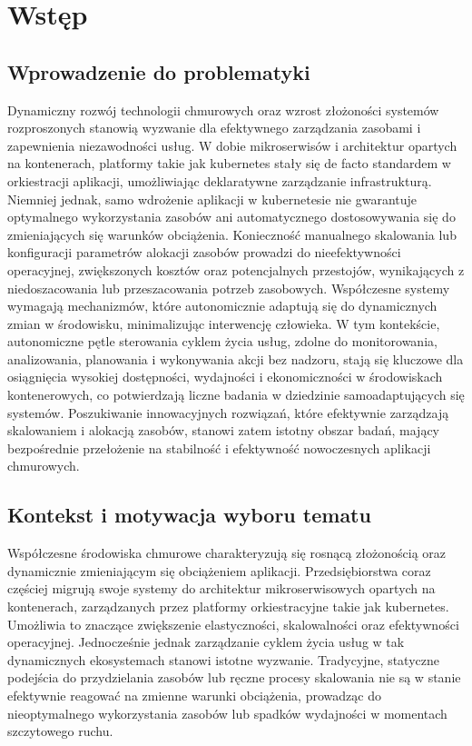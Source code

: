 \newpage

\section{Wstęp}

\subsection{Wprowadzenie do problematyki}

Dynamiczny rozwój technologii chmurowych oraz wzrost złożoności systemów rozproszonych 
stanowią wyzwanie dla efektywnego zarządzania zasobami i zapewnienia niezawodności usług. 
W dobie mikroserwisów i architektur opartych na kontenerach, platformy takie jak 
\Gls{kubernetes} stały się de facto standardem w orkiestracji aplikacji, umożliwiając 
deklaratywne zarządzanie infrastrukturą. Niemniej jednak, samo wdrożenie aplikacji w 
\Gls{kubernetes}ie nie gwarantuje optymalnego wykorzystania zasobów ani automatycznego 
dostosowywania się do zmieniających się warunków obciążenia. Konieczność manualnego 
skalowania lub konfiguracji parametrów alokacji zasobów prowadzi do nieefektywności 
operacyjnej, zwiększonych kosztów oraz potencjalnych przestojów, wynikających z 
niedoszacowania lub przeszacowania potrzeb zasobowych. Współczesne systemy wymagają 
mechanizmów, które autonomicznie adaptują się do dynamicznych zmian w środowisku, 
minimalizując interwencję człowieka. W tym kontekście, autonomiczne pętle sterowania 
cyklem życia usług, zdolne do monitorowania, analizowania, planowania i wykonywania 
akcji bez nadzoru, stają się kluczowe dla osiągnięcia wysokiej dostępności, wydajności 
i ekonomiczności w środowiskach kontenerowych, co potwierdzają liczne badania w 
dziedzinie samoadaptujących się systemów. Poszukiwanie innowacyjnych rozwiązań, które 
efektywnie zarządzają skalowaniem i alokacją zasobów, stanowi zatem istotny obszar 
badań, mający bezpośrednie przełożenie na stabilność i efektywność nowoczesnych 
aplikacji chmurowych.

\subsection{Kontekst i motywacja wyboru tematu}

Współczesne środowiska chmurowe charakteryzują się rosnącą złożonością oraz dynamicznie 
zmieniającym się obciążeniem aplikacji. Przedsiębiorstwa coraz częściej migrują swoje 
systemy do architektur mikroserwisowych opartych na kontenerach, zarządzanych przez 
platformy orkiestracyjne takie jak \Gls{kubernetes}. Umożliwia to znaczące zwiększenie 
elastyczności, skalowalności oraz efektywności operacyjnej. Jednocześnie jednak 
zarządzanie cyklem życia usług w tak dynamicznych ekosystemach stanowi istotne wyzwanie. 
Tradycyjne, statyczne podejścia do przydzielania zasobów lub ręczne procesy skalowania 
nie są w stanie efektywnie reagować na zmienne warunki obciążenia, prowadząc do 
nieoptymalnego wykorzystania zasobów lub spadków wydajności w momentach szczytowego 
ruchu.

